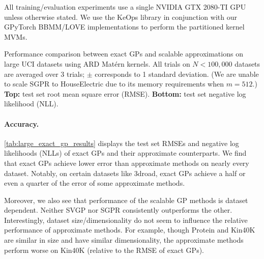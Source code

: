 All training/evaluation experiments use a single NVIDIA GTX 2080-TI GPU unless otherwise stated.
We use the KeOps library \cite{charlier2020kernel} in conjunction with our GPyTorch BBMM/LOVE implementations to perform the partitioned kernel MVMs.

\begin{table}[!tb]
  \caption[Performance comparison between exact GPs and scalable approximations on large UCI datasets.]{
    Performance comparison between exact GPs and scalable approximations on large UCI datasets using ARD Mat\'ern kernels.
    All trials on $N < 100,\!000$ datasets are averaged over 3 trials; $\pm$ corresponds to 1 standard deviation.
    (We are unable to scale SGPR to HouseElectric due to its memory requirements when $m=512$.)
    {\bf Top:} test set root mean square error (RMSE).
    {\bf Bottom:} test set negative log likelihood (NLL).
  }
  \label{tab:large_exact_gp_results}
  \centering
  \vspace{1em}

  \resizebox{\textwidth}{!}{%
    
  }
  \vspace{1em}

  \resizebox{\textwidth}{!}{%
    
  }
  \vspace{1em}
\end{table}

\paragraph{Accuracy.}
\cref{tab:large_exact_gp_results} displays the test set RMSEs and negative log likelihoods (NLLs) of exact GPs and their approximate counterparts.
We find that exact GPs achieve lower error than approximate methods on nearly every dataset.
Notably, on certain datasets like 3droad, exact GPs achieve a half or even a quarter of the error of some approximate methods.

Moreover, we also see that performance of the scalable GP methods is dataset dependent.
Neither SVGP nor SGPR consistently outperforms the other.
Interestingly, dataset size/dimensionality do not seem to influence the relative performance of approximate methods.
For example, though Protein and Kin40K are similar in size and have similar dimensionality, the approximate methods perform worse on Kin40K (relative to the RMSE of exact GPs).

